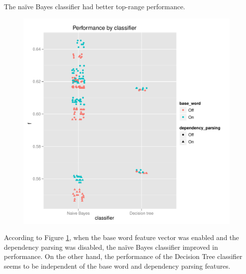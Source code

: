 \documentclass{article}
\newcommand{\naive}{na\"ive}
\begin{document}
The \naive{} Bayes classifier had better top-range performance.

\begin{figure}
\includegraphics[width=\textwidth]{pg_0003}
\caption{\label{fig3}}
\end{figure}

According to Figure \ref{fig3}, when the base word feature vector was
enabled and the dependency parsing was disabled, the \naive{} Bayes
classifier improved in performance. On the other hand, the performance
of the Decision Tree classifier seems to be independent of the base
word and dependency parsing features.
\end{document}
